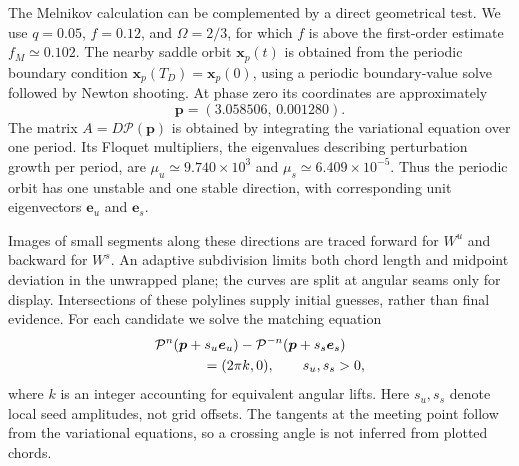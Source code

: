 \documentclass[aps,prb,reprint,floatfix]{revtex4-2}
\newcommand{\vect}[1]{\bm{#1}}
\begin{document}
The Melnikov calculation can be complemented by a direct geometrical test. We use $q=0.05$, $f=0.12$, and $\Omega=2/3$, for which $f$ is above the first-order estimate $f_M\simeq0.102$. The nearby saddle orbit $\vect x_p(t)$ is obtained from the periodic boundary condition $\vect x_p(T_D)=\vect x_p(0)$, using a periodic boundary-value solve followed by Newton shooting. At phase zero its coordinates are approximately
\begin{equation}
\vect p=(3.058506,\,0.001280).
\end{equation}
The matrix $A=D\mathcal P(\vect p)$ is obtained by integrating the variational equation over one period. Its Floquet multipliers, the eigenvalues describing perturbation growth per period, are $\mu_u\simeq9.740\times10^3$ and $\mu_s\simeq6.409\times10^{-5}$. Thus the periodic orbit has one unstable and one stable direction, with corresponding unit eigenvectors $\vect e_u$ and $\vect e_s$.

Images of small segments along these directions are traced forward for $W^u$ and backward for $W^s$. An adaptive subdivision limits both chord length and midpoint deviation in the unwrapped plane; the curves are split at angular seams only for display. Intersections of these polylines supply initial guesses, rather than final evidence. For each candidate we solve the matching equation
\begin{align}
&\mathcal P^n(\vect p+s_u\vect e_u)
-\mathcal P^{-n}(\vect p+s_s\vect e_s)\notag\\
&\hspace{1.2cm}=(2\pi k,0),\qquad s_u,s_s>0,
\label{eq:crossing_matching}
\end{align}
where $k$ is an integer accounting for equivalent angular lifts. Here $s_u,s_s$ denote local seed amplitudes, not grid offsets. The tangents at the meeting point follow from the variational equations, so a crossing angle is not inferred from plotted chords.
\end{document}

